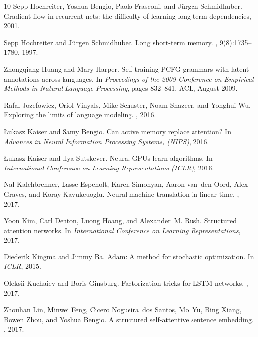 \documentclass{article}
\begin{document}
\begin{thebibliography}{10}
Sepp Hochreiter, Yoshua Bengio, Paolo Frasconi, and J{\"u}rgen Schmidhuber.
\newblock Gradient flow in recurrent nets: the difficulty of learning long-term
  dependencies, 2001.

Sepp Hochreiter and J{\"u}rgen Schmidhuber.
\newblock Long short-term memory.
, 9(8):1735--1780, 1997.

Zhongqiang Huang and Mary Harper.
\newblock Self-training {PCFG} grammars with latent annotations across
  languages.
\newblock In {\em Proceedings of the 2009 Conference on Empirical Methods in
  Natural Language Processing}, pages 832--841. ACL, August 2009.

Rafal Jozefowicz, Oriol Vinyals, Mike Schuster, Noam Shazeer, and Yonghui Wu.
\newblock Exploring the limits of language modeling.
, 2016.

{\L}ukasz Kaiser and Samy Bengio.
\newblock Can active memory replace attention?
\newblock In {\em Advances in Neural Information Processing Systems, ({NIPS})},
  2016.

\L{}ukasz Kaiser and Ilya Sutskever.
\newblock Neural {GPU}s learn algorithms.
\newblock In {\em International Conference on Learning Representations
  ({ICLR})}, 2016.

Nal Kalchbrenner, Lasse Espeholt, Karen Simonyan, Aaron van~den Oord, Alex
  Graves, and Koray Kavukcuoglu.
\newblock Neural machine translation in linear time.
, 2017.

Yoon Kim, Carl Denton, Luong Hoang, and Alexander~M. Rush.
\newblock Structured attention networks.
\newblock In {\em International Conference on Learning Representations}, 2017.

Diederik Kingma and Jimmy Ba.
\newblock Adam: A method for stochastic optimization.
\newblock In {\em ICLR}, 2015.

Oleksii Kuchaiev and Boris Ginsburg.
\newblock Factorization tricks for {LSTM} networks.
, 2017.

Zhouhan Lin, Minwei Feng, Cicero Nogueira~dos Santos, Mo~Yu, Bing Xiang, Bowen
  Zhou, and Yoshua Bengio.
\newblock A structured self-attentive sentence embedding.
, 2017.


\end{thebibliography}
\end{document}
